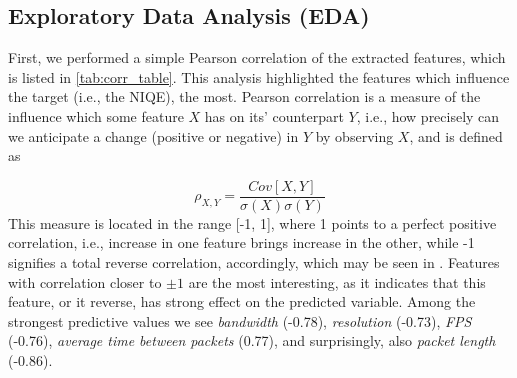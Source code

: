 \subsection{Exploratory Data Analysis (EDA)}
\label{sec:eda}
First, we performed a simple Pearson correlation \cite{pearson1895vii} of the extracted features, which is listed in \cref{tab:corr_table}. This analysis highlighted the features which influence the target (i.e., the NIQE), the most. Pearson correlation is a measure of the influence which some feature $X$ has on its' counterpart $Y$, i.e., how precisely can we anticipate a change (positive or negative) in $Y$ by observing $X$, and is defined as 

\begin{equation}
    \rho_{X,Y} = \frac{Cov[X,Y]}{\sigma(X)\sigma(Y)}
\label{eq:pearson_cor}
\end{equation}
This measure is located in the range [-1, 1], where 1 points to a perfect positive correlation, i.e., increase in one feature brings increase in the other, while -1 signifies a total reverse correlation, accordingly, which may be seen in . Features with correlation closer to $\pm{1}$ are the most interesting, as it indicates that this feature, or it reverse, has strong effect on the predicted variable. 
Among the strongest predictive values we see \emph{bandwidth} (-0.78), \emph{resolution} (-0.73), \emph{FPS} (-0.76), \emph{average time between packets} (0.77), and surprisingly, also \emph{packet length} (-0.86). 

